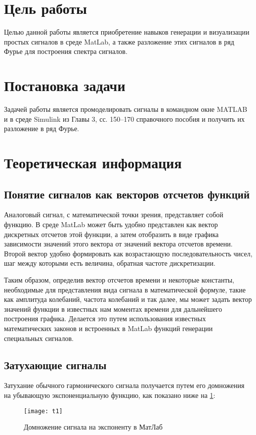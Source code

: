







\section{Цель работы}
Целью данной работы является приобретение навыков генерации и визуализации простых сигналов в среде MatLab, а также разложение этих сигналов в ряд Фурье для построения спектра сигналов.

\section{Постановка задачи}
Задачей работы является промоделировать сигналы в командном окне MATLAB и в среде Simulink из Главы 3, сс. 150–170 справочного пособия и получить их разложение в ряд Фурье.

\section{Теоретическая информация}
\subsection{Понятие сигналов как векторов отсчетов функций}
Аналоговый сигнал, с математической точки зрения, представляет собой функцию. В среде  MatLab может быть удобно представлен как вектор дискретных отсчетов этой функции, а затем отобразить в виде графика зависимости значений этого вектора от значений вектора отсчетов времени. Второй вектор удобно формировать как возрастающую последовательность чисел, шаг между которыми есть величина, обратная частоте дискретизации.

Таким образом, определив вектор отсчетов времени и некоторые константы, необходимые для представления вида сигнала в математической формуле, такие как амплитуда колебаний, частота колебаний и так далее, мы может задать вектор значений функции в известных нам моментах времени для дальнейшего построения графика. Делается это путем использования известных математических законов и встроенных в MatLab функций генерации специальных сигналов.

\subsection{Затухающие сигналы}
Затухание обычного гармонического сигнала получается путем его домножения на убывающую экспоненциальную функцию, как показано ниже на \ref{pic:t1}:
\begin{figure}[H]
	\begin{center}
		\texttt{[image: t1]}
		\caption{Домножение сигнала на экспоненту в МатЛаб} 
		\label{pic:t1} %
	\end{center}
\end{figure}

